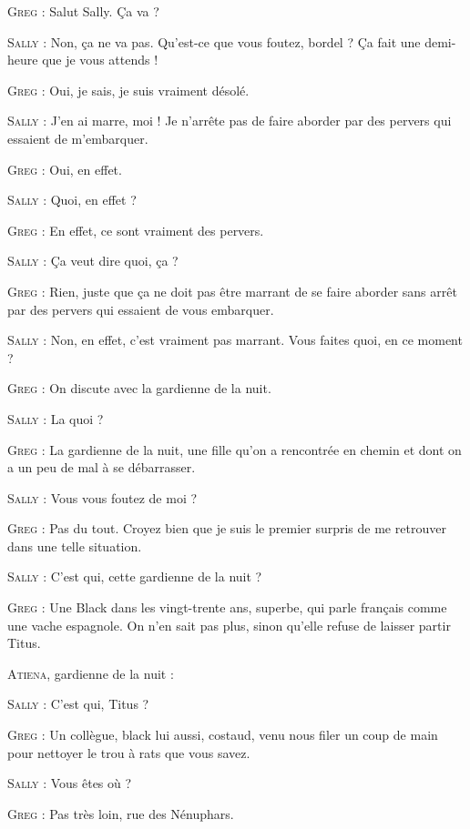 \begin{dialogue}
    
\textsc{Greg} : Salut Sally. Ça va ?

\textsc{Sally} : Non, ça ne va pas. Qu’est-ce que vous foutez, bordel ? Ça fait une demi-heure que je vous attends !

\textsc{Greg} : Oui, je sais, je suis vraiment désolé.

\textsc{Sally} : J’en ai marre, moi ! Je n’arrête pas de faire aborder par des pervers qui essaient de m’embarquer.

\textsc{Greg} : Oui, en effet.

\textsc{Sally} : Quoi, en effet ?

\textsc{Greg} : En effet, ce sont vraiment des pervers.

\textsc{Sally} : Ça veut dire quoi, ça ?

\textsc{Greg} : Rien, juste que ça ne doit pas être marrant de se faire aborder sans arrêt par des pervers qui essaient de vous embarquer.

\textsc{Sally} : Non, en effet, c’est vraiment pas marrant. Vous faites quoi, en ce moment ?

\textsc{Greg} : On discute avec la gardienne de la nuit.

\textsc{Sally} : La quoi ?

\textsc{Greg} : La gardienne de la nuit, une fille qu’on a rencontrée en chemin et dont on a un peu de mal à se débarrasser.

\textsc{Sally} : Vous vous foutez de moi ?

\textsc{Greg} : Pas du tout. Croyez bien que je suis le premier surpris de me retrouver dans une telle situation.

\textsc{Sally} : C’est qui, cette gardienne de la nuit ?

\textsc{Greg} : Une Black dans les vingt-trente ans, superbe, qui parle français comme une vache espagnole. On n’en sait pas plus, sinon qu’elle refuse de laisser partir Titus.

\textsc{Atiena}, gardienne de la nuit : 

\textsc{Sally} : C’est qui, Titus ?

\textsc{Greg} : Un collègue, black lui aussi, costaud, venu nous filer un coup de main pour nettoyer le trou à rats que vous savez.

\textsc{Sally} : Vous êtes où ?

\textsc{Greg} : Pas très loin, rue des Nénuphars.

\end{dialogue}

